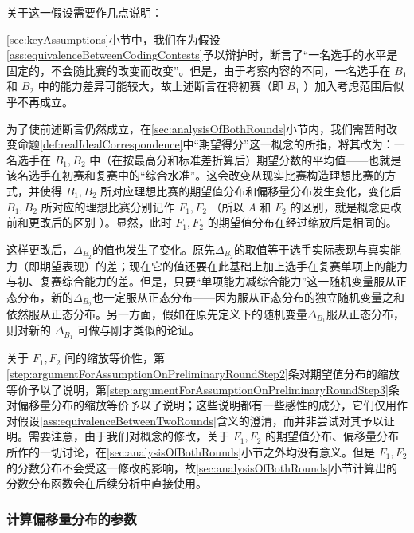             关于这一假设需要作几点说明：
            \begin{asparaenum}
                \item \ref{sec:keyAssumptions}小节中，我们在为假设\ref{ass:equivalenceBetweenCodingContests}予以辩护时，断言了“一名选手的水平是固定的，不会随比赛的改变而改变”。但是，由于考察内容的不同，一名选手在 $B_1$ 和 $B_2$ 中的能力差异可能较大，故上述断言在将初赛（即 $B_1$ ）加入考虑范围后似乎不再成立。
                \item \label{step:argumentForAssumptionOnPreliminaryRoundStep2} 为了使前述断言仍然成立，在\ref{sec:analysisOfBothRounds}小节内，我们需暂时改变命题\ref{def:realIdealCorrespondence}中“期望得分”这一概念的所指，将其改为：一名选手在 $B_1,B_2$ 中（在按最高分和标准差折算后）期望分数的平均值——也就是该名选手在初赛和复赛中的“综合水准”。这会改变从现实比赛构造理想比赛的方式，并使得 $B_1,B_2$ 所对应理想比赛的期望值分布和偏移量分布发生变化，变化后 $B_1,B_2$ 所对应的理想比赛分别记作 $F_1,F_2$ （所以 $A$ 和 $F_2$ 的区别，就是概念更改前和更改后的区别 ）。显然，此时 $F_1,F_2$ 的期望值分布在经过缩放后是相同的。
                \item \label{step:argumentForAssumptionOnPreliminaryRoundStep3} 这样更改后，$\Delta_{B_2}$的值也发生了变化。原先$\Delta_{B_2}$的取值等于选手实际表现与真实能力（即期望表现）的差；现在它的值还要在此基础上加上选手在复赛单项上的能力与初、复赛综合能力的差。但是，只要“单项能力减综合能力”这一随机变量服从正态分布，新的$\Delta_{B_2}$也一定服从正态分布——因为服从正态分布的独立随机变量之和依然服从正态分布。另一方面，假如在原先定义下的随机变量$\Delta_{B_1}$服从正态分布，则对新的 $\Delta_{B_1}$ 可做与刚才类似的论证。
                \item 关于 $F_1,F_2$ 间的缩放等价性，第\ref{step:argumentForAssumptionOnPreliminaryRoundStep2}条对期望值分布的缩放等价予以了说明，第\ref{step:argumentForAssumptionOnPreliminaryRoundStep3}条对偏移量分布的缩放等价予以了说明；这些说明都有一些感性的成分，它们仅用作对假设\ref{ass:equivalenceBetweenTwoRounds}含义的澄清，而并非尝试对其予以证明。需要注意，由于我们对概念的修改，关于 $F_1,F_2$ 的期望值分布、偏移量分布所作的一切讨论，在\ref{sec:analysisOfBothRounds}小节之外均没有意义。但是 $F_1,F_2$ 的分数分布不会受这一修改的影响，故\ref{sec:analysisOfBothRounds}小节计算出的分数分布函数会在后续分析中直接使用。
            \end{asparaenum}

        \subsubsection{计算偏移量分布的参数}\label{sec:parameterOfDeltaDistribution}

